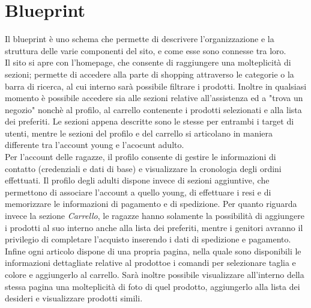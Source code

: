 \documentclass[12pt,a4paper]{report}
\begin{document}
\chapter{Blueprint}
Il blueprint è uno schema che permette di descrivere l'organizzazione e la struttura delle varie componenti del sito, e come esse sono connesse tra loro.\\
Il sito si apre con l'homepage, che consente di raggiungere una molteplicità di sezioni; permette di accedere alla parte di shopping attraverso le categorie o la barra di ricerca, al cui interno sarà possibile filtrare i prodotti. Inoltre in qualsiasi momento è possibile accedere sia alle sezioni relative all'assistenza ed a "trova un negozio" nonchè al profilo, al carrello contenente i prodotti selezionati e alla lista dei preferiti. Le sezioni appena descritte sono le stesse per entrambi i target di utenti, mentre le sezioni del profilo e del carrello si articolano in maniera differente tra l'account young e l'acocunt adulto.\\
Per l'account delle ragazze, il profilo consente di gestire le informazioni di contatto (credenziali e dati di base) e visualizzare la cronologia degli ordini effettuati. Il profilo degli adulti dispone invece di sezioni aggiuntive, che permettono di associare l'account a quello young, di effettuare i resi e di memorizzare le informazioni di pagamento e di spedizione. Per quanto riguarda invece la sezione \textit{Carrello}, le ragazze hanno solamente la possibilità di aggiungere i prodotti al suo interno anche alla lista dei preferiti, mentre i genitori avranno il privilegio di completare l'acquisto inserendo i dati di spedizione e pagamento.\\
Infine ogni articolo dispone di una propria pagina, nella quale sono disponibili le informazioni dettagliate relative al prodottoe i comandi per selezionare taglia e colore e aggiungerlo al carrello. Sarà inoltre possibile visualizzare all'interno della stessa pagina una molteplicità di foto di quel prodotto, aggiungerlo alla lista dei desideri e visualizzare prodotti simili.\\\\
\end{document}
